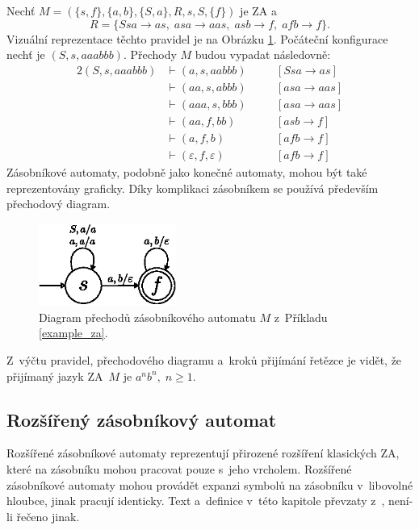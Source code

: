 \begin{example}\label{example_za}
    Nechť $M = (\{s, f\}, \{a, b\}, \{S, a\}, R, s, S, \{f\})$ je ZA a 
    \begin{equation*}
        R = \{Ssa \rightarrow as,\; asa \rightarrow aas,\; asb \rightarrow f,\; afb \rightarrow f\}.
    \end{equation*}
    Vizuální reprezentace těchto pravidel je na Obrázku \ref{fig_diagram_prechodu_za}.
    Počáteční konfigurace nechť je $(S, s, aaabbb)$.
    Přechody $M$ budou vypadat následovně:
    \begin{alignat*}{2}
        (S, s, aaabbb) &\vdash (a, s, aabbb) \quad && [Ssa \rightarrow as] \\
                       &\vdash (aa, s, abbb) \quad && [asa \rightarrow aas] \\
                       &\vdash (aaa, s, bbb) \quad && [asa \rightarrow aas] \\
                       &\vdash (aa, f, bb) \quad   && [asb \rightarrow f] \\ 
                       &\vdash (a, f, b) \quad      && [afb \rightarrow f] \\
                       &\vdash (\varepsilon, f, \varepsilon) \quad && [afb \rightarrow f]
    \end{alignat*}
    Zásobníkové automaty, podobně jako konečné automaty, mohou být také reprezentovány graficky.
    Díky komplikaci zásobníkem se používá především přechodový diagram.
    \begin{figure}[t]
        \centering
        \includegraphics[width=0.4\textwidth]{obrazky-figures/za_diagram_prechodu.eps}
        \caption{Diagram přechodů zásobníkového automatu $M$ z~Příkladu \ref{example_za}.}
        \label{fig_diagram_prechodu_za}
    \end{figure}
    Z~výčtu pravidel, přechodového diagramu a~kroků přijímání řetězce je vidět, že přijímaný jazyk ZA~$M$ je $a^nb^n,\; n \geq 1$.
\end{example}

\subsection*{Rozšířený zásobníkový automat}\label{kap_rozsireny_ZA}
Rozšířené zásobníkové automaty reprezentují přirozené rozšíření klasických ZA, které na zásobníku mohou pracovat pouze s~jeho vrcholem.
Rozšířené zásobníkové automaty mohou provádět expanzi symbolů na zásobníku v~libovolné hloubce, jinak pracují identicky.
Text a~definice v~této kapitole převzaty z~\cite{meduna2023automata}, není-li řečeno jinak.

